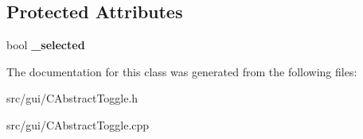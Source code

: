 \subsection*{Protected Attributes}
\begin{DoxyCompactItemize}
\item 
\hypertarget{class_c_abstract_toggle_a842605c85e31e1094ef358de17601585}{
bool {\bfseries \_\-selected}}
\label{class_c_abstract_toggle_a842605c85e31e1094ef358de17601585}

\end{DoxyCompactItemize}


The documentation for this class was generated from the following files:\begin{DoxyCompactItemize}
\item 
src/gui/CAbstractToggle.h\item 
src/gui/CAbstractToggle.cpp\end{DoxyCompactItemize}
